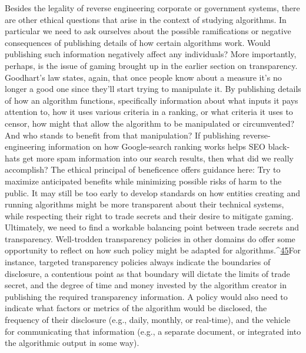 Besides the legality of reverse engineering corporate or government systems, there are other ethical questions that arise in the context of studying algorithms. In particular we need to ask ourselves about the possible ramifications or negative consequences of publishing details of how certain algorithms work. Would publishing such information negatively affect any individuals? More importantly, perhaps, is the issue of gaming brought up in the earlier section on transparency. Goodhart's law states, again, that once people know about a measure it's no longer a good one since they'll start trying to manipulate it. By publishing details of how an algorithm functions, specifically information about what inputs it pays attention to, how it uses various criteria in a ranking, or what criteria it uses to censor, how might that allow the algorithm to be manipulated or circumvented? And who stands to benefit from that manipulation? If publishing reverse-engineering information on how Google-search ranking works helps SEO black-hats get more spam information into our search results, then what did we really accomplish? The ethical principal of beneficence offers guidance here: Try to maximize anticipated benefits while minimizing possible risks of harm to the public. 
It may still be too early to develop standards on how entities creating and running algorithms might be more transparent about their technical systems, while respecting their right to trade secrets and their desire to mitigate gaming. Ultimately, we need to find a workable balancing point between trade secrets and transparency. Well-trodden transparency policies in other 
domains do offer some opportunity to reflect on how such policy might be adapted for algorithms.^{\href{#endnotes}{45}}For instance, targeted transparency policies always indicate the boundaries of disclosure, a contentious point as that boundary will dictate the limits of trade secret, and the degree of time and money invested by the algorithm creator in publishing the required transparency information. A policy would also need to indicate what factors or metrics of the algorithm would be disclosed, the frequency of their disclosure (e.g., daily, monthly, or real-time), and the vehicle for communicating that information (e.g., a separate document, or integrated into the algorithmic output in some way). 
